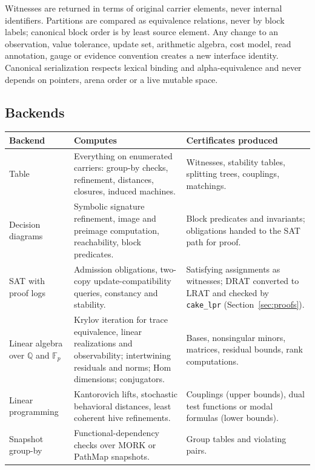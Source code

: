 \documentclass[11pt]{article}
\newcommand{\code}[1]{\texttt{#1}}
\newcommand{\F}{\mathbb{F}}
\newcommand{\Q}{\mathbb{Q}}
\begin{document}
Witnesses are returned in terms of original carrier elements, never internal identifiers. Partitions
are compared as equivalence relations, never by block labels; canonical block order is by least source
element. Any change to an observation, value tolerance, update set, arithmetic algebra, cost model,
read annotation, gauge or evidence convention creates a new interface identity. Canonical
serialization respects lexical binding and alpha-equivalence and never depends on pointers, arena
order or a live mutable space.

\subsection{Backends}\label{sec:backends}

\begin{longtable}{>{\raggedright\arraybackslash}p{3.0cm}>{\raggedright\arraybackslash}p{5.6cm}>{\raggedright\arraybackslash}p{5.2cm}}
\toprule
Backend & Computes & Certificates produced\\
\midrule
\endhead
Table & Everything on enumerated carriers: group-by checks, refinement, distances, closures, induced machines. & Witnesses, stability tables, splitting trees, couplings, matchings.\\
Decision diagrams & Symbolic signature refinement, image and preimage computation, reachability, block predicates. & Block predicates and invariants; obligations handed to the SAT path for proof.\\
SAT with proof logs & Admission obligations, two-copy update-compatibility queries, constancy and stability. & Satisfying assignments as witnesses; DRAT converted to LRAT and checked by \code{cake\_lpr} (Section~\ref{sec:proofs}).\\
Linear algebra over $\Q$ and $\F_p$ & Krylov iteration for trace equivalence, linear realizations and observability; intertwining residuals and norms; Hom dimensions; conjugators. & Bases, nonsingular minors, matrices, residual bounds, rank computations.\\
Linear programming & Kantorovich lifts, stochastic behavioral distances, least coherent hive refinements. & Couplings (upper bounds), dual test functions or modal formulas (lower bounds).\\
Snapshot group-by & Functional-dependency checks over MORK or PathMap snapshots. & Group tables and violating pairs.\\
\bottomrule
\end{longtable}
\end{document}
